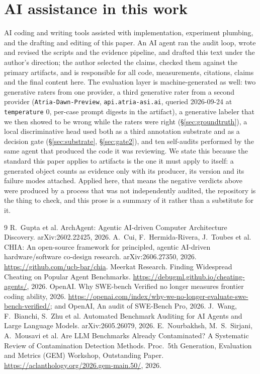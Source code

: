 \documentclass[10pt,twocolumn]{article}
\begin{document}
\section*{AI assistance in this work}
AI coding and writing tools assisted with implementation, experiment plumbing, and the
drafting and editing of this paper. An AI agent ran the audit loop, wrote and revised the
scripts and the evidence pipeline, and drafted this text under the author's direction; the
author selected the claims, checked them against the primary artifacts, and is responsible
for all code, measurements, citations, claims and the final content here.
The evaluation layer is machine-generated as well: two generative raters from one
provider, a third generative rater from a second provider (\texttt{Atria-Dawn-Preview},
\texttt{api.atria-asi.ai}, queried 2026-09-24 at \texttt{temperature} 0, per-case prompt
digests in the artifact), a generative
labeler that we then showed to be wrong while the raters were right
(\S\ref{sec:groundtruth}), a local discriminative head used both as a third annotation
substrate and as a decision gate (\S\ref{sec:substrate}, \S\ref{sec:gate2}), and ten
self-audits performed by the same agent that produced the code it was reviewing. We state
this because the standard this paper applies to artifacts is the one it must apply to
itself: a generated object counts as evidence only with its producer, its version and its
failure modes attached. Applied here, that means the negative verdicts above were produced
by a process that was not independently audited, the repository is the thing to check, and
this prose is a summary of it rather than a substitute for it.


\begin{thebibliography}{9}\scriptsize
{} R.\ Gupta et al. ArchAgent: Agentic AI-driven Computer
Architecture Discovery. arXiv:2602.22425, 2026.
 A.\ Cui, F.\ Hermida-Rivera, J.\ Toubes et al. CHIA: An open-source
framework for principled, agentic AI-driven hardware/software co-design research.
arXiv:2606.27350, 2026. \url{https://github.com/ucb-bar/chia}.
 Meerkat Research. Finding Widespread Cheating on Popular Agent
Benchmarks. \url{https://debugml.github.io/cheating-agents/}, 2026.
 OpenAI. Why SWE-bench Verified no longer measures frontier coding
ability, 2026. \url{https://openai.com/index/why-we-no-longer-evaluate-swe-bench-verified/};
and OpenAI, An audit of SWE-Bench Pro, 2026.
 J.\ Wang, F.\ Bianchi, S.\ Zhu et al. Automated Benchmark Auditing
for AI Agents and Large Language Models. arXiv:2605.26079, 2026.
 E.\ Nourbakhsh, M.\ S.\ Sirjani, A.\ Mousavi et al. Are LLM
Benchmarks Already Contaminated? A Systematic Review of Contamination Detection
Methods. Proc.\ 5th Generation, Evaluation and Metrics (GEM) Workshop, Outstanding
Paper. \url{https://aclanthology.org/2026.gem-main.50/}, 2026.
\end{thebibliography}
\end{document}
